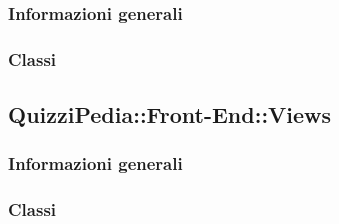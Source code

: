 \subsubsection{Informazioni generali}
\subsubsection{Classi}

\subsection{QuizziPedia::Front-End::Views}
\subsubsection{Informazioni generali}
\subsubsection{Classi}